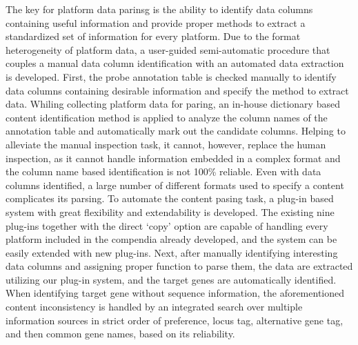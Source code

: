 The key for platform data parinsg is the ability to identify data columns
containing useful information and provide proper methods to extract a
standardized set of information for every platform.
%
Due to the format heterogeneity of platform data, a user-guided semi-automatic
procedure that couples a manual data column identification with an automated
data extraction is developed.
%
First, the probe annotation table is checked manually to identify data columns
containing desirable information and specify the method to extract data.
%
Whiling collecting platform data for paring, an in-house dictionary based
content identification method is applied to analyze the column names of the
annotation table and automatically mark out the candidate columns.
%
Helping to alleviate the manual inspection task, it cannot, however, replace
the human inspection, as it cannot handle information embedded in a complex
format and the column name based identification is not 100\% reliable.
%
Even with data columns identified, a large number of different formats used to
specify a content complicates its parsing.
To automate the content pasing task, a plug-in based system with great
flexibility and extendability is developed.
%
The existing nine plug-ins together with the direct `copy' option are capable
of handling every platform included in the compendia already developed, and
the system can be easily extended with new plug-ins.
%
Next, after manually identifying interesting data columns and assigning proper
function to parse them, the data are extracted utilizing our plug-in system,
and the target genes are automatically identified.
%
When identifying target gene without sequence information, the aforementioned
content inconsistency is handled by an integrated search over multiple
information sources in strict order of preference, locus tag, alternative gene
tag, and then common gene names, based on its reliability.




